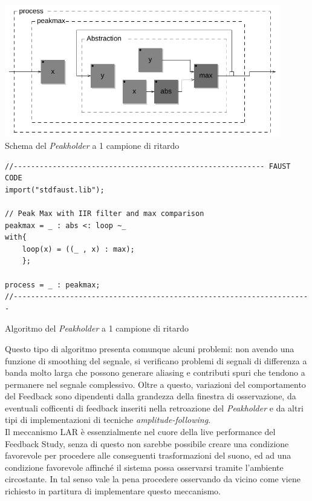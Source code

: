 \begin{center}
\includegraphics[width=12cm]{figures/PeakholderIIR.pdf} \\
{Schema del \textit{Peakholder} a 1 campione di ritardo} \\ 
\vspace{0.5cm}
\end{center}

\clearpage
\vspace{0.5cm}
\begin{lstlisting}
//---------------------------------------------------------- FAUST CODE
import("stdfaust.lib");

// Peak Max with IIR filter and max comparison
peakmax = _ : abs <: loop ~_
with{
    loop(x) = ((_ , x) : max);
    };
    
process = _ : peakmax;
//---------------------------------------------------------------------
\end{lstlisting}
\begin{center}
Algoritmo del \textit{Peakholder} a 1 campione di ritardo
\end{center}
\vspace{0.5cm}

Questo tipo di algoritmo presenta comunque alcuni problemi: non avendo
una funzione di smoothing del segnale, si verificano problemi di segnali di differenza a banda
molto larga che possono generare aliasing e contributi spuri che tendono a permanere nel
segnale complessivo.
Oltre a questo, variazioni del comportamento del Feedback sono dipendenti dalla grandezza
della finestra di osservazione, da eventuali cofficenti di feedback inseriti nella
retroazione del \textit{Peakholder} e da altri tipi di implementazioni di tecniche 
\textit{amplitude-following}. \\
Il meccanismo LAR è essenzialmente nel cuore della live performance del Feedback Study,
senza di questo non sarebbe possibile creare una condizione favorevole per procedere alle 
conseguenti trasformazioni del suono, ed ad una condizione favorevole affinché il 
sistema possa osservarsi tramite l'ambiente circostante. 
In tal senso vale la pena procedere osservando da vicino come viene richiesto in partitura 
di implementare questo meccanismo.
\clearpage

